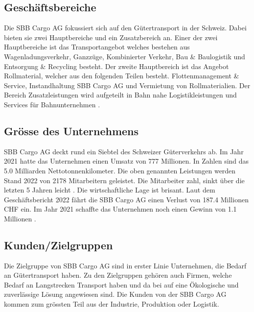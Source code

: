 \documentclass{article}
\begin{document}
\subsection{Geschäftsbereiche}

Die SBB Cargo AG fokussiert sich auf den Gütertransport in der Schweiz.
Dabei bieten sie zwei Hauptbereiche und ein Zusatzbereich an.
Einer der zwei Hauptbereiche ist das Transportangebot welches bestehen aus Wagenladungsverkehr, Ganzzüge, Kombinierter Verkehr, Bau \& Baulogistik und Entsorgung \& Recycling besteht.
Der zweite Hauptbereich ist das Angebot Rollmaterial, welcher aus den folgenden Teilen besteht. Flottenmanagement \& Service, Instandhaltung SBB Cargo AG und Vermietung von Rollmaterialien. 
Der Bereich Zusatzleistungen wird aufgeteilt in Bahn nahe Logistikleistungen und Services für Bahnunternehmen \parencite[o. S.]{angebot}.

\subsection{Grösse des Unternehmens}

SBB Cargo AG deckt rund ein Siebtel des Schweizer Güterverkehrs ab.
Im Jahr 2021 hatte das Unternehmen einen Umsatz von 777 Millionen.
In Zahlen sind das 5.0 Milliarden Nettotonnenkilometer.
Die oben genannten Leistungen werden Stand 2022 von 2178 Mitarbeitern geleistet.
Die Mitarbeiter zahl, sinkt über die letzten 5 Jahren leicht \parencite[o. S.]{personal}.
Die wirtschaftliche Lage ist brisant.
Laut dem Geschäftsbericht 2022 fährt die SBB Cargo AG einen Verlust von 187.4 Millionen CHF ein.
Im Jahr 2021 schaffte das Unternehmen noch einen Gewinn von 1.1 Millionen \parencite[S. 46]{geschaeftsbericht2022}.

\subsection{Kunden/Zielgruppen}

Die Zielgruppe von SBB Cargo AG sind in erster Linie Unternehmen, die Bedarf an Gütertransport haben.
Zu den Zielgruppen gehören auch Firmen, welche Bedarf an Langstrecken Transport haben und da bei auf eine Ökologische und zuverlässige Lösung angewiesen sind.
Die Kunden von der SBB Cargo AG kommen zum grössten Teil aus der Industrie, Produktion oder Logistik.
\end{document}
